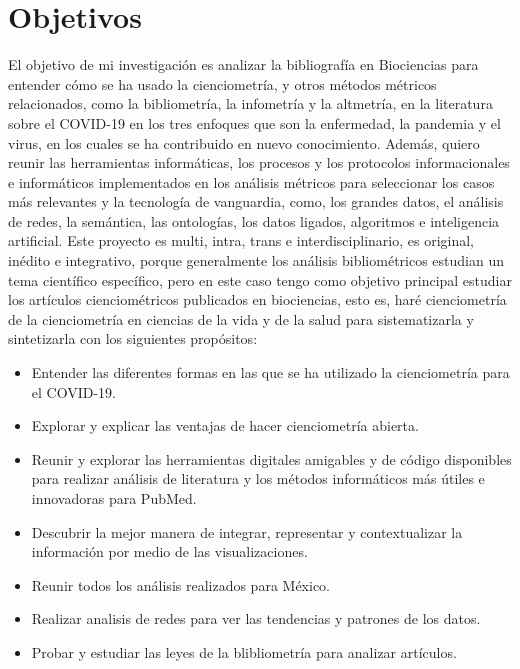 \section{Objetivos}
\noindent
El objetivo de mi investigación es analizar la bibliografía en Biociencias para entender cómo se ha usado la cienciometría, y otros métodos métricos relacionados, como la bibliometría, la infometría y la altmetría, en la literatura sobre el COVID-19 en los tres enfoques que son la enfermedad, la pandemia y el virus, en los cuales se ha contribuido en nuevo conocimiento.  
Además, quiero reunir las herramientas informáticas, los procesos y los protocolos informacionales e informáticos implementados en los análisis métricos para seleccionar los casos más relevantes y la tecnología de vanguardia, como, los grandes datos, el análisis de redes, la semántica, las ontologías, los datos ligados, algoritmos e inteligencia artificial.  
Este proyecto es multi, intra, trans e interdisciplinario, es original, inédito e integrativo, porque generalmente los análisis bibliométricos estudian un tema científico específico, pero en este caso tengo como objetivo principal estudiar los artículos cienciométricos publicados en biociencias, esto es, haré cienciometría de la cienciometría en ciencias de la vida y de la salud para sistematizarla y sintetizarla con los siguientes propósitos: 
\begin{itemize}
    \item Entender las diferentes formas en las que se ha utilizado la cienciometría para el COVID-19.
    \item Explorar y explicar las ventajas de hacer cienciometría abierta.
    \item Reunir y explorar las herramientas digitales amigables  y de código disponibles para realizar análisis de literatura y los métodos informáticos más útiles e innovadoras para PubMed.
    \item Descubrir la mejor manera de integrar, representar y contextualizar la información por medio de las visualizaciones.
    \item Reunir todos los análisis realizados para México.
    \item Realizar analisis de redes para ver las tendencias y patrones de los datos.
    \item Probar y estudiar las leyes de la blibliometría para analizar artículos. 
\end{itemize}



